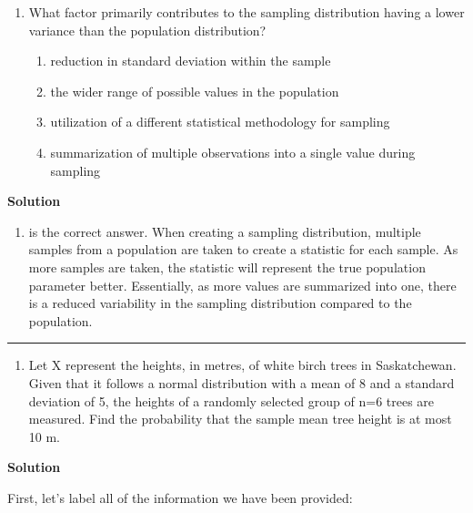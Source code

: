 \documentclass[
  letterpaper,
  DIV=11,
  numbers=noendperiod,
  oneside]{scrreprt}
\providecommand{\tightlist}{%
  \setlength{\itemsep}{0pt}\setlength{\parskip}{0pt}}\usepackage{longtable,booktabs,array}
\begin{document}
\begin{enumerate}
\def\labelenumi{\arabic{enumi}.}
\tightlist
\item
  What factor primarily contributes to the sampling distribution having
  a lower variance than the population distribution?

  \begin{enumerate}
  \def\labelenumii{\alph{enumii}.}
  \tightlist
  \item
    reduction in standard deviation within the sample
  \item
    the wider range of possible values in the population
  \item
    utilization of a different statistical methodology for sampling
  \item
    summarization of multiple observations into a single value during
    sampling
  \end{enumerate}
\end{enumerate}

\textbf{Solution}

\begin{enumerate}
\def\labelenumi{\Alph{enumi})}
\setcounter{enumi}{3}
\tightlist
\item
  is the correct answer. When creating a sampling distribution, multiple
  samples from a population are taken to create a statistic for each
  sample. As more samples are taken, the statistic will represent the
  true population parameter better. Essentially, as more values are
  summarized into one, there is a reduced variability in the sampling
  distribution compared to the population.
\end{enumerate}

\begin{center}\rule{0.5\linewidth}{0.5pt}\end{center}

\begin{enumerate}
\def\labelenumi{\arabic{enumi}.}
\setcounter{enumi}{1}
\tightlist
\item
  Let X represent the heights, in metres, of white birch trees in
  Saskatchewan. Given that it follows a normal distribution with a mean
  of 8 and a standard deviation of 5, the heights of a randomly selected
  group of n=6 trees are measured. Find the probability that the sample
  mean tree height is at most 10 m.
\end{enumerate}

\textbf{Solution}

First, let's label all of the information we have been provided:
\end{document}
